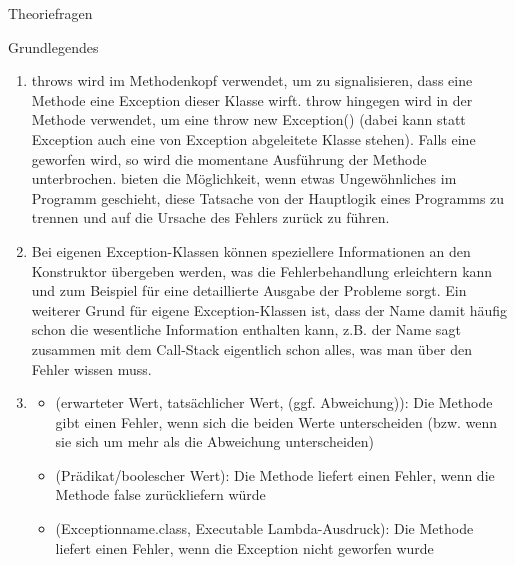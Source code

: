 \documentclass{../preamble}
\begin{document}
\begin{task}[credit = \stars{0}{3}]{Theoriefragen}
\begin{subtask*}{Grundlegendes}
\begin{solution}
\begin{enumerate}
                \item \textcolor{keywordcolor}{throws} wird im Methodenkopf verwendet, um zu signalisieren, dass eine Methode eine Exception dieser Klasse wirft.
                      \newline
                      \textcolor{keywordcolor}{throw} hingegen wird in der Methode verwendet, um eine  \textcolor{keywordcolor}{throw new} Exception() (dabei kann statt Exception auch eine von Exception abgeleitete Klasse stehen). Falls eine  geworfen wird, so wird die momentane Ausführung der Methode unterbrochen.  bieten die Möglichkeit, wenn etwas Ungewöhnliches im Programm geschieht, diese Tatsache von der Hauptlogik eines Programms zu trennen und auf die Ursache des Fehlers zurück zu führen.
                \item Bei eigenen Exception-Klassen können speziellere Informationen an den Konstruktor übergeben werden, was die Fehlerbehandlung erleichtern kann und zum Beispiel für eine detaillierte Ausgabe der Probleme sorgt.
                      \br
                      Ein weiterer Grund für eigene Exception-Klassen ist, dass der Name damit häufig schon die wesentliche Information enthalten kann, z.B. der Name  sagt zusammen mit dem Call-Stack eigentlich schon alles, was man über den Fehler wissen muss.
                \item
                      \begin{itemize}
                          \item {}(erwarteter Wert, tatsächlicher Wert, (ggf. Abweichung)):
                                \newline
                                Die Methode gibt einen Fehler, wenn sich die beiden Werte unterscheiden (bzw. wenn sie sich um mehr als die Abweichung unterscheiden)
                          \item {}(Prädikat/boolescher Wert):
                                \newline
                                Die Methode liefert einen Fehler, wenn die Methode false zurückliefern würde
                          \item {}(Exceptionname.\textcolor{keywordcolor}{class}, Executable Lambda-Ausdruck): \newline
                                Die Methode liefert einen Fehler, wenn die Exception nicht geworfen wurde
                                \begin{lstlisting}[style = Java]

\end{lstlisting}
\end{itemize}
\end{enumerate}
\end{solution}
\end{subtask*}
\end{task}
\end{document}
